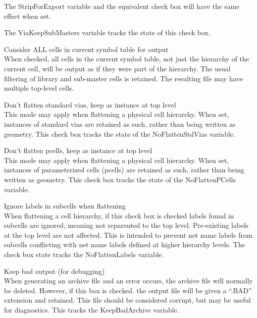 \begin{description}
The {\et StripForExport} variable and the equivalent check box will
have the same effect when set.

The {\et ViaKeepSubMasters} variable tracks the state of this check
box.

\item{\cb Consider ALL cells in current symbol table for output}\\
When checked, all cells in the current symbol table, not just the
hierarchy of the current cell, will be output as if they were part of
the hierarchy.  The usual filtering of library and sub-master cells is
retained.  The resulting file may have multiple top-level cells.

\item{\cb Don't flatten standard vias, keep as instance at top level}\\
This mode may apply when flattening a physical cell hierarchy.  When
set, instances of standard vias are retained as such, rather than
being written as geometry.  This check box tracks the state of the
{\et NoFlattenStdVias} variable.

\item{\cb Don't flatten pcells, keep as instance at top level}\\
This mode may apply when flattening a physical cell hierarchy.  When
set, instances of parameterized cells (pcells) are retained as such,
rather than being written as geometry.  This check box tracks the
state of the {\et NoFlattenPCells} variable.

\item{\cb Ignore labels in subcells when flattening}\\
When flattening a cell hierarchy, if this check box is checked labels
found in subcells are ignored, meaning not reparented to the top
level.  Pre-existing labels at the top level are not affected.  This
is intended to prevent net name labels from subcells conflicting with
net name labels defined at higher hierarchy levels.  The check box
state tracks the {\et NoFlattenLabels} variable.

\item{\cb Keep bad output (for debugging)}\\
When generating an archive file and an error occurs, the archive file
will normally be deleted.  However, if this box is checked.  the
output file will be given a ``{\vt .BAD}'' extension and retained. 
This file should be considered corrupt, but may be useful for
diagnostics.  This tracks the {\et KeepBadArchive} variable.
\end{description}

